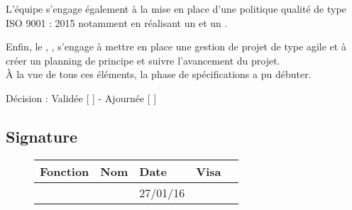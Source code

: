 \documentclass[asi, sansVersion]{picInsa}
\begin{document}
L'équipe \nomEquipe{} s'engage également à la mise en place d'une politique qualité de type ISO 9001 : 2015 notamment en réalisant un \PQ{} et un \PGC{}.

Enfin, le \CP{}, \Sergi{}, s'engage à mettre en place une gestion de projet de type agile et à créer un planning de principe et suivre l'avancement du projet. \\


À la vue de tous ces éléments, la phase de spécifications a pu débuter.

\begin{center}
Décision : Validée [ \checkmark{} ] - Ajournée [ ]
\end{center}

\subsection*{Signature}
\begin{figure}[H]
		\centering
		\begin{tabularx}{17cm}{|p{4cm}|X|X|X|X|}
		\hline
		\rowcolor[gray]{0.85} Fonction & Nom & Date & Visa \\
		\hline
		\CP{} & \Sergi{} & 27/01/16 &  \\
		\hline
		\end{tabularx}
\end{figure}
\end{document}
